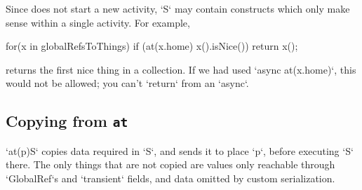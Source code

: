 Since 
does not start a new activity, 
\xcd`S` may contain constructs which only make sense
within a single activity.  
For example, 
\begin{xten}
    for(x in globalRefsToThings) 
      if (at(x.home) x().isNice()) 
        return x();
\end{xten}
returns the first nice thing in a collection.   If we had used 
\xcd`async at(x.home)`, this would not be allowed; 
you can't \xcd`return` from an
\xcd`async`. 




\subsection{Copying from {\tt at} }

\xcd`at(p)S` copies data required in \xcd`S`, and sends it
to place \xcd`p`, before executing \xcd`S` there. The only things that are not
copied are values only reachable through \xcd`GlobalRef`s and \xcd`transient`
fields, and data omitted by custom serialization.    

